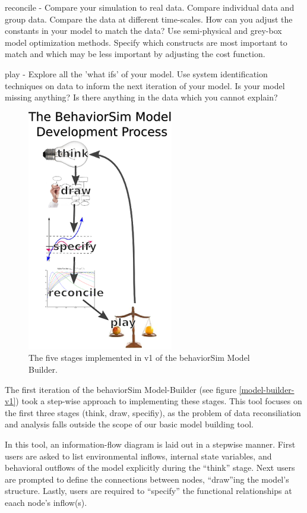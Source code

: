 \documentclass[conference]{IEEEtran}
\begin{document}
reconcile - 
Compare your simulation to real data. 
Compare individual data and group data. 
Compare the data at different time-scales. 
How can you adjust the constants in your model to match the data? 
Use semi-physical and grey-box model optimization methods. 
Specify which constructs are most important to match and which may be less important by adjusting the cost function.

play - 
Explore all the 'what ifs' of your model. 
Use system identification techniques on data to inform the next iteration of your model. 
Is your model missing anything? 
Is there anything in the data which you cannot explain? 

\begin{figure}[!t]
  \centering
  \includegraphics[width=0.5\columnwidth]{img/behaviorSim_process}  
  \caption{The five stages implemented in v1 of the behaviorSim Model Builder.}
  \label{model-builder-stages}
\end{figure}
  
The first iteration of the behaviorSim Model-Builder (see figure \ref{model-builder-v1}) took a step-wise approach to implementing these stages.
This tool focuses on the first three stages (think, draw, specifiy), as the problem of data reconsiliation and analysis falls outside the scope of our basic model building tool.

In this tool, an information-flow diagram is laid out in a stepwise manner.
First users are asked to list environmental inflows, internal state variables, and behavioral outflows of the model explicitly during the ``think'' stage.
Next users are prompted to define the connections between nodes, ``draw''ing the model's structure.
Lastly, users are required to ``specify'' the functional relationships at eaach node's inflow(s).
\end{document}
